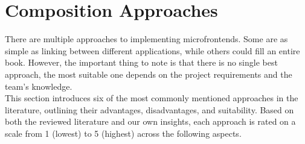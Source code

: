 \section{Composition Approaches}
There are multiple approaches to implementing microfrontends. Some are as simple as linking between different applications, while others could fill an entire book. However, the important thing to note is that there is no single best approach, the most suitable one depends on the project requirements and the team's knowledge. \\

\noindent
This section introduces six of the most commonly mentioned approaches in the literature, outlining their advantages, disadvantages, and suitability.  Based on both the reviewed literature and our own insights, each approach is rated on a scale from 1 (lowest) to 5 (highest) across the following aspects.

